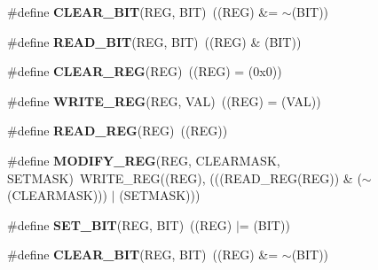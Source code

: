 \begin{DoxyCompactItemize}
\item 
\hypertarget{group___exported__macro_ga133aae6fc0d41bffab39ab223a7001de}{\#define {\bfseries C\-L\-E\-A\-R\-\_\-\-B\-I\-T}(R\-E\-G, B\-I\-T)~((R\-E\-G) \&= $\sim$(B\-I\-T))}\label{group___exported__macro_ga133aae6fc0d41bffab39ab223a7001de}

\item 
\hypertarget{group___exported__macro_ga822bb1bb9710d5f2fa6396b84e583c33}{\#define {\bfseries R\-E\-A\-D\-\_\-\-B\-I\-T}(R\-E\-G, B\-I\-T)~((R\-E\-G) \& (B\-I\-T))}\label{group___exported__macro_ga822bb1bb9710d5f2fa6396b84e583c33}

\item 
\hypertarget{group___exported__macro_ga1378fbdda39f40b85420df55f41460ef}{\#define {\bfseries C\-L\-E\-A\-R\-\_\-\-R\-E\-G}(R\-E\-G)~((R\-E\-G) = (0x0))}\label{group___exported__macro_ga1378fbdda39f40b85420df55f41460ef}

\item 
\hypertarget{group___exported__macro_ga32f78bffcaf6d13023dcd7f05e0c4d57}{\#define {\bfseries W\-R\-I\-T\-E\-\_\-\-R\-E\-G}(R\-E\-G, V\-A\-L)~((R\-E\-G) = (V\-A\-L))}\label{group___exported__macro_ga32f78bffcaf6d13023dcd7f05e0c4d57}

\item 
\hypertarget{group___exported__macro_gae7f188a4d26c9e713a48414783421071}{\#define {\bfseries R\-E\-A\-D\-\_\-\-R\-E\-G}(R\-E\-G)~((R\-E\-G))}\label{group___exported__macro_gae7f188a4d26c9e713a48414783421071}

\item 
\hypertarget{group___exported__macro_ga6553c99f510c3bab8cc0a91602053247}{\#define {\bfseries M\-O\-D\-I\-F\-Y\-\_\-\-R\-E\-G}(R\-E\-G, C\-L\-E\-A\-R\-M\-A\-S\-K, S\-E\-T\-M\-A\-S\-K)~W\-R\-I\-T\-E\-\_\-\-R\-E\-G((R\-E\-G), (((R\-E\-A\-D\-\_\-\-R\-E\-G(R\-E\-G)) \& ($\sim$(C\-L\-E\-A\-R\-M\-A\-S\-K))) $\vert$ (S\-E\-T\-M\-A\-S\-K)))}\label{group___exported__macro_ga6553c99f510c3bab8cc0a91602053247}

\item 
\hypertarget{group___exported__macro_ga26474f43799fbade9cf300e21dd3a91a}{\#define {\bfseries S\-E\-T\-\_\-\-B\-I\-T}(R\-E\-G, B\-I\-T)~((R\-E\-G) $\vert$= (B\-I\-T))}\label{group___exported__macro_ga26474f43799fbade9cf300e21dd3a91a}

\item 
\hypertarget{group___exported__macro_ga133aae6fc0d41bffab39ab223a7001de}{\#define {\bfseries C\-L\-E\-A\-R\-\_\-\-B\-I\-T}(R\-E\-G, B\-I\-T)~((R\-E\-G) \&= $\sim$(B\-I\-T))}\label{group___exported__macro_ga133aae6fc0d41bffab39ab223a7001de}


\end{DoxyCompactItemize}
